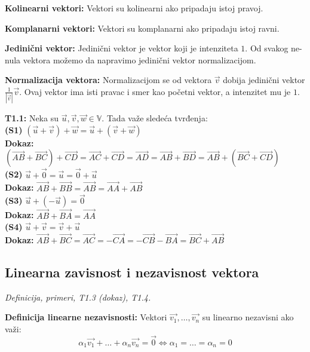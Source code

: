 \documentclass[12pt]{article}
\newcommand{\vek}[1]{\overrightarrow{#1}}
\begin{document}
\textbf{Kolinearni vektori:} Vektori su kolinearni ako pripadaju istoj pravoj.
\par

\textbf{Komplanarni vektori:} Vektori su komplanarni ako pripadaju istoj ravni.
\par

\textbf{Jedinični vektor:} Jedinični vektor je vektor koji je intenziteta $1$.
Od svakog ne-nula vektora možemo da napravimo jedinični vektor normalizacijom.
\par

\textbf{Normalizacija vektora:} Normalizacijom se od vektora $\vek{v}$ dobija
jedinični vektor $\frac{1}{|\vek{v}|}\vek{v}$. Ovaj vektor ima isti pravac
i smer kao početni vektor, a intenzitet mu je $1$.
\par

\textbf{T1.1:} Neka su $\vek{u}, \vek{v}, \vek{w}\in\mathbb{V}$. Tada važe
sledeća tvrđenja:\\
\textbf{(S1)}
$(\vek{u}+\vek{v})+\vek{w}=\vek{u}+(\vek{v}+\vek{w})$\\
\textbf{Dokaz:}
$(\vek{AB}+\vek{BC})+\vek{CD}=\vek{AC}+\vek{CD}=\vek{AD}=\vek{AB}+\vek{BD}
    =\vek{AB}+(\vek{BC}+\vek{CD})$\\
\textbf{(S2)}
$\vek{u}+\vek{0}=\vek{u}=\vek{0}+\vek{u}$\\
\textbf{Dokaz:}
$\vek{AB}+\vek{BB}=\vek{AB}=\vek{AA}+\vek{AB}$\\
\textbf{(S3)}
$\vek{u}+(-\vek{u})=\vek{0}$\\
\textbf{Dokaz:}
$\vek{AB}+\vek{BA}=\vek{AA}$\\
\textbf{(S4)}
$\vek{u}+\vek{v}=\vek{v}+\vek{u}$\\
\textbf{Dokaz:}
$\vek{AB}+\vek{BC}=\vek{AC}=-\vek{CA}=-\vek{CB}-\vek{BA}=\vek{BC}+\vek{AB}$


\subsection{Linearna zavisnost i nezavisnost vektora}
\textit{Definicija, primeri, T1.3 (dokaz), T1.4.}
\par
\vspace*{1cm}

\textbf{Definicija linearne nezavisnosti:} Vektori $\vek{v_1},\dotsc,\vek{v_n}$
su linearno nezavisni ako važi:
$$\alpha_1\vek{v_1}+\dotsc+\alpha_n\vek{v_n}=\vek{0} \iff \alpha_1=
    \dotsc=\alpha_n=0$$
\par
\end{document}
